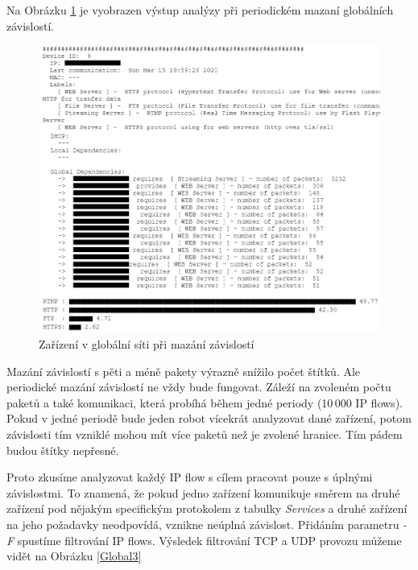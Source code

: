 \documentclass[thesis=B,czech,hidelinks]{FITthesis}[2019/03/21]
\begin{document}
    Na Obrázku \ref{Global2} je vyobrazen výstup analýzy při periodickém mazaní globálních závislostí. 
    \begin{figure}[h!]
        \centering
        \includegraphics[width=\textwidth]{Global_delete_5}
        \caption[Ukázka měření: Globální síť s periodickým mazáním závislostí]{Zařízení v globální síti při mazání závislostí}
        \label{Global2}
    \end{figure}
    
    Mazání závislostí s pěti a méně pakety výrazně snížilo počet štítků. Ale periodické mazání závislostí ne vždy bude fungovat. Záleží na zvoleném počtu paketů a také komunikaci, která probíhá během jedné periody (10\,000 IP flows). Pokud v jedné periodě bude jeden robot vícekrát analyzovat dané zařízení, potom závislosti tím vzniklé mohou mít více paketů než je zvolené hranice. Tím pádem budou štítky nepřesné.
    
    Proto zkusíme analyzovat každý IP flow s cílem pracovat pouze s úplnými závislostmi. To znamená, že pokud jedno zařízení komunikuje směrem na druhé zařízení pod nějakým specifickým protokolem z tabulky \emph{Services} a druhé zařízení na jeho požadavky neodpovídá, vznikne neúplná závislost. Přidáním parametru \emph{-F} spustíme filtrování IP flows. Výsledek filtrování TCP a UDP provozu můžeme vidět na Obrázku \ref{Global3}
    
\end{document}
